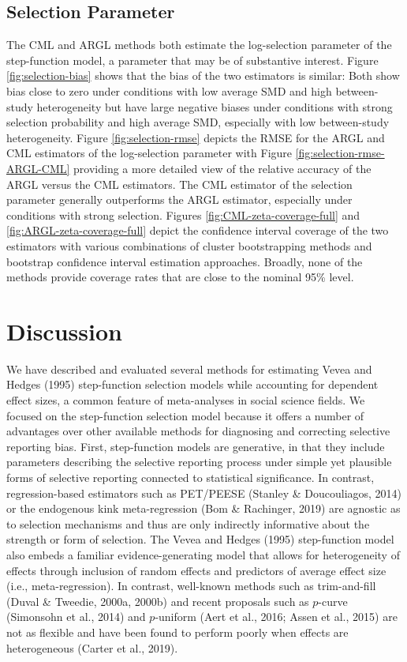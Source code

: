 \documentclass[
  man, donotrepeattitle,floatsintext]{apa7}
\begin{document}
\subsection{Selection Parameter}\label{selection-parameter}

The CML and ARGL methods both estimate the log-selection parameter of the step-function model, a parameter that may be of substantive interest.
Figure \ref{fig:selection-bias} shows that the bias of the two estimators is similar: Both show bias close to zero under conditions with low average SMD and high between-study heterogeneity but have large negative biases under conditions with strong selection probability and high average SMD, especially with low between-study heterogeneity.
Figure \ref{fig:selection-rmse} depicts the RMSE for the ARGL and CML estimators of the log-selection parameter with Figure \ref{fig:selection-rmse-ARGL-CML} providing a more detailed view of the relative accuracy of the ARGL versus the CML estimators.
The CML estimator of the selection parameter generally outperforms the ARGL estimator, especially under conditions with strong selection.
Figures \ref{fig:CML-zeta-coverage-full} and \ref{fig:ARGL-zeta-coverage-full} depict the confidence interval coverage of the two estimators with various combinations of cluster bootstrapping methods and bootstrap confidence interval estimation approaches.
Broadly, none of the methods provide coverage rates that are close to the nominal 95\% level.

\section{Discussion}\label{discussion}

We have described and evaluated several methods for estimating Vevea and Hedges (1995) step-function selection models while accounting for dependent effect sizes, a common feature of meta-analyses in social science fields.
We focused on the step-function selection model because it offers a number of advantages over other available methods for diagnosing and correcting selective reporting bias.
First, step-function models are generative, in that they include parameters describing the selective reporting process under simple yet plausible forms of selective reporting connected to statistical significance.
In contrast, regression-based estimators such as PET/PEESE (Stanley \& Doucouliagos, 2014) or the endogenous kink meta-regression (Bom \& Rachinger, 2019) are agnostic as to selection mechanisms and thus are only indirectly informative about the strength or form of selection.
The Vevea and Hedges (1995) step-function model also embeds a familiar evidence-generating model that allows for heterogeneity of effects through inclusion of random effects and predictors of average effect size (i.e., meta-regression).
In contrast, well-known methods such as trim-and-fill (Duval \& Tweedie, 2000a, 2000b) and recent proposals such as \(p\)-curve (Simonsohn et al., 2014) and \(p\)-uniform (Aert et al., 2016; Assen et al., 2015) are not as flexible and have been found to perform poorly when effects are heterogeneous (Carter et al., 2019).
\end{document}
